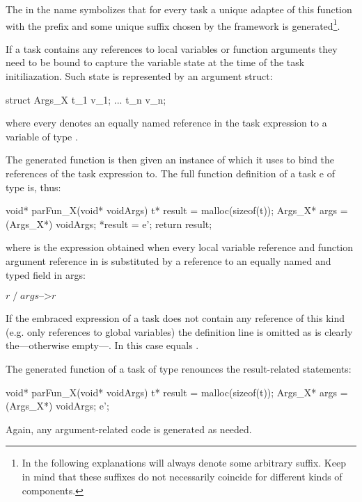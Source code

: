 The  in the name symbolizes that for every task a unique adaptee of this function with the prefix  and some unique suffix chosen by the framework is generated\footnote{In the following explanations  will always denote some arbitrary suffix. Keep in mind that these suffixes do not necessarily coincide for different kinds of components.}.

If a task contains any references to local variables or function arguments they need to be bound to capture the variable state at the time of the task initiliazation. Such state is represented by an argument struct:

\begin{ccode}
struct Args_X {
  t_1 v_1;
  ...
  t_n v_n;
}
\end{ccode}

where every  denotes an equally named reference in the task expression to a variable of type .

The generated function  is then given an instance of  which it uses to bind the references of the task expression to. The full function definition of a task e of type  is, thus:

\begin{ccode}
void* parFun_X(void* voidArgs) {
  t* result = malloc(sizeof(t));
  Args_X* args = (Args_X*) voidArgs;
  *result = e';
  return result;
}
\end{ccode}

where  is the expression obtained when every local variable reference and function argument reference  in  is substituted by a reference to an equally named and typed field in args:

$r\;/\;args\text{-->}r$

If the embraced expression of a task does not contain any reference of this kind (e.g. only references to global variables) the  definition line is omitted as is clearly the---otherwise empty---. In this case  equals .

The generated function of a task of type  renounces the result-related statements:

\begin{ccode}
void* parFun_X(void* voidArgs) {
  t* result = malloc(sizeof(t));
  Args_X* args = (Args_X*) voidArgs;
  e';
}
\end{ccode}

Again, any argument-related code is generated as needed.

